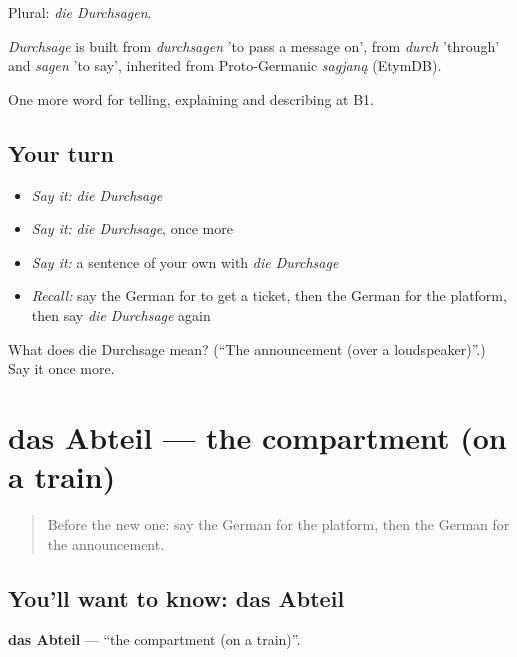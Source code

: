 Plural: \emph{die Durchsagen}.

\begin{cousinweb}
\emph{Durchsage} is built from \emph{durchsagen} 'to pass a message on', from \emph{durch} 'through' and \emph{sagen} 'to say', inherited from Proto-Germanic \emph{sagjaną} (EtymDB).
\end{cousinweb}

\begin{grammarlens}[title={What you've built}]
One more word for telling, explaining and describing at B1.
\end{grammarlens}

\subsection*{Your turn}
\begin{itemize}
\raggedright
  \item \emph{Say it:} \emph{die Durchsage}
  \item \emph{Say it:} \emph{die Durchsage}, once more
  \item \emph{Say it:} a sentence of your own with \emph{die Durchsage}
  \item \emph{Recall:} say the German for to get a ticket, then the German for the platform, then say \emph{die Durchsage} again
\end{itemize}

\begin{tcolorbox}[breakable,colback=teal!4,colframe=teal!35!black,title={Before you move on}]
What does die Durchsage mean? (\textquotedblleft{}The announcement (over a loudspeaker)\textquotedblright{}.) Say it once more.
\end{tcolorbox}
\section[das Abteil]{das Abteil — the compartment (on a train)}

\label{lesson:GE-C412-abteil}



\begin{quote}
Before the new one: say the German for the platform, then the German for the announcement.
\end{quote}

\subsection*{You'll want to know: das Abteil}
\textbf{das Abteil} — \textquotedblleft{}the compartment (on a train)\textquotedblright{}.

